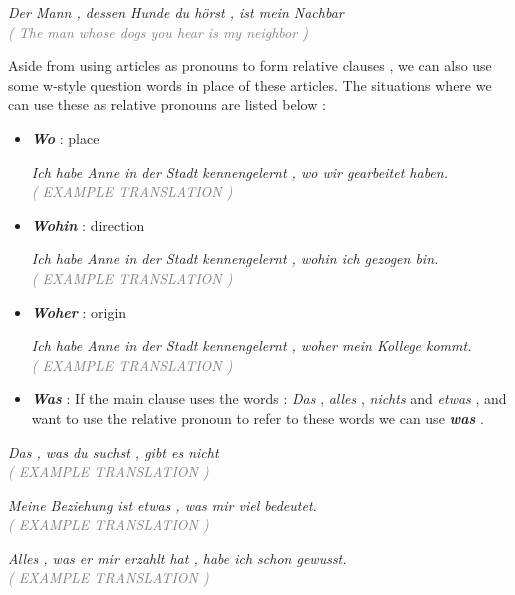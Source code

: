 \documentclass[a4paper,twocolumn,10pt]{article}
\newcommand{\newpar}
{\par \vspace{0.3cm}}
\begin{document}
\noindent
\textit{Der Mann , dessen Hunde du hörst , ist mein Nachbar}\\
\textcolor{gray} { \textit{( The man whose dogs you hear is my neighbor )} } \newpar

Aside from using articles as pronouns to form relative clauses , we can also use
some w-style question words in place of these articles. The situations where we
can use these as relative pronouns are listed below :



\begin{itemize}[noitemsep]

	\item \textbf{\textit{Wo}} : place

\noindent
\textit{Ich habe Anne in der Stadt kennengelernt , wo wir gearbeitet haben. }\\
\textcolor{gray} { \textit{( EXAMPLE TRANSLATION )} } \newpar

	\item \textbf{\textit{Wohin}} : direction

\textit{Ich habe Anne in der Stadt kennengelernt , wohin ich gezogen bin. }\\
\textcolor{gray} { \textit{( EXAMPLE TRANSLATION )} } \newpar


	\item \textbf{\textit{Woher}} : origin

\textit{Ich habe Anne in der Stadt kennengelernt , woher mein Kollege kommt. }\\
\textcolor{gray} { \textit{( EXAMPLE TRANSLATION )} } \newpar


	\item \textbf{\textit{Was}} : If the main clause uses the words :
		\textit{Das} , \textit{alles} , \textit{nichts} and \textit{etwas} , and
		want to use the relative pronoun to refer to these words we can use
		\textbf{\textit{was}} .  \end{itemize}


\noindent
\textit{Das , was du suchst , gibt es nicht}\\
\textcolor{gray} { \textit{( EXAMPLE TRANSLATION )} } \newpar


\noindent
\textit{Meine Beziehung ist etwas , was mir viel bedeutet.}\\
\textcolor{gray} { \textit{( EXAMPLE TRANSLATION )} } \newpar


\noindent
\textit{Alles , was er mir erzahlt hat , habe ich schon gewusst.}\\
\textcolor{gray} { \textit{( EXAMPLE TRANSLATION )} } \newpar
\end{document}
